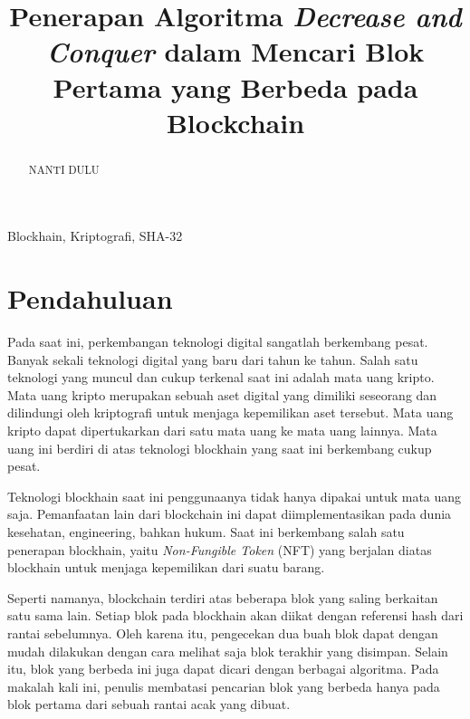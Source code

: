 \documentclass[10pt,conference]{IEEEtran}
\theoremstyle{definition}
\begin{document}
\title{Penerapan Algoritma  \emph{Decrease and Conquer} dalam Mencari Blok Pertama yang Berbeda pada Blockchain}

\author{
}

\maketitle

\begin{abstract}
NANTI DULU
\end{abstract}

\begin{IEEEkeywords}
Blockhain, Kriptografi, SHA-32
\end{IEEEkeywords}

\section{Pendahuluan}
Pada saat ini, perkembangan teknologi digital sangatlah berkembang pesat. Banyak sekali teknologi digital yang baru dari tahun ke tahun. Salah satu teknologi yang muncul dan cukup terkenal saat ini adalah mata uang kripto. Mata uang kripto merupakan sebuah aset digital yang dimiliki seseorang dan dilindungi oleh kriptografi untuk menjaga kepemilikan aset tersebut. Mata uang kripto dapat dipertukarkan dari satu mata uang ke mata uang lainnya. Mata uang ini berdiri di atas teknologi blockhain yang saat ini berkembang cukup pesat.

Teknologi blockhain saat ini penggunaanya tidak hanya dipakai untuk mata uang saja. Pemanfaatan lain dari blockchain ini dapat diimplementasikan pada dunia kesehatan, engineering, bahkan hukum. Saat ini berkembang salah satu penerapan blockhain, yaitu \emph{Non-Fungible Token} (NFT) yang berjalan diatas blockhain untuk menjaga kepemilikan dari suatu barang.

Seperti namanya, blockchain terdiri atas beberapa blok yang saling berkaitan satu sama lain. Setiap blok pada blockhain akan diikat dengan referensi hash dari rantai sebelumnya. Oleh karena itu, pengecekan dua buah blok dapat dengan mudah dilakukan dengan cara melihat saja blok terakhir yang disimpan. Selain itu, blok yang  berbeda ini juga dapat dicari dengan berbagai algoritma. Pada makalah kali ini, penulis membatasi pencarian blok yang berbeda hanya pada blok pertama dari sebuah rantai acak yang dibuat.
\end{document}
